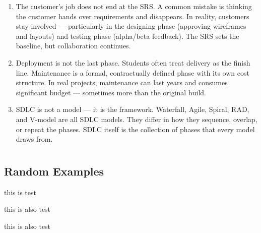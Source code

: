 \documentclass{report}
\begin{document}
\begin{miss}
\begin{enumerate}
\item The customer's job does not end at the SRS. A common mistake is thinking the customer hands over requirements and disappears. In reality, customers stay involved — particularly in the designing phase (approving wireframes and layouts) and testing phase (alpha/beta feedback). The SRS sets the baseline, but collaboration continues.
\item Deployment is not the last phase. Students often treat delivery as the finish line. Maintenance is a formal, contractually defined phase with its own cost structure. In real projects, maintenance can last years and consumes significant budget — sometimes more than the original build.
\item SDLC is not a model — it is the framework. Waterfall, Agile, Spiral, RAD, and V-model are all SDLC models. They differ in how they sequence, overlap, or repeat the phases. SDLC itself is the collection of phases that every model draws from.
\end{enumerate}
\end{miss}


\chapter{}
\section{Random Examples}
\begin{eli5}
    this is test
\end{eli5}

\begin{real}
this is also test
\end{real}

\begin{further}
this is also test
\end{further}
\end{document}
